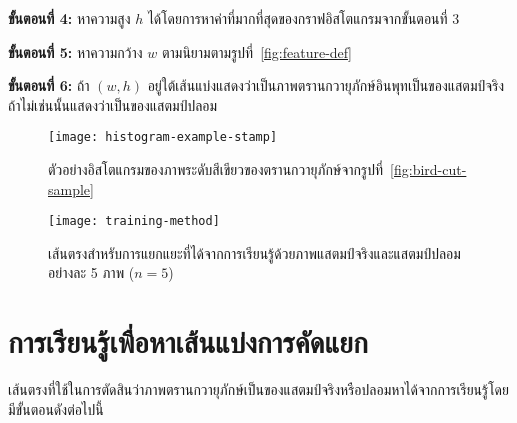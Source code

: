 \textbf{ขั้นตอนที่ 4:} หาความสูง $h$ ได้โดยการหาค่าที่มากที่สุดของกราฟอิสโตแกรมจากขั้นตอนที่ 3

\textbf{ขั้นตอนที่ 5:} หาความกว้าง $w$ ตามนิยามตามรูปที่~\ref{fig:feature-def}

\textbf{ขั้นตอนที่ 6:} ถ้า $(w,h)$ อยู่ใต้เส้นแบ่งแสดงว่าเป็นภาพตรานกวายุภักษ์อินพุทเป็นของแสตมป์จริง ถ้าไม่เช่นนั้นแสดงว่าเป็นของแสตมป์ปลอม



\begin{figure}[!ht]
\centering
\vspace{2em}
\texttt{[image: histogram-example-stamp]}
\vspace{2em}
\caption{ตัวอย่างอิสโตแกรมของภาพระดับสีเขียวของตรานกวายุภักษ์จากรูปที่~\ref{fig:bird-cut-sample}}
\label{fig:histogram-example}
\end{figure}

\begin{figure}[!hb]
\centering
\vspace{2em}
\texttt{[image: training-method]}
\vspace{2em}
\caption{เส้นตรงสำหรับการแยกแยะที่ได้จากการเรียนรู้ด้วยภาพแสตมป์จริงและแสตมป์ปลอมอย่างละ 5 ภาพ ($n=5$)}
\label{fig:training-result}
\end{figure}

\section{การเรียนรู้เพื่อหาเส้นแบ่งการคัดแยก}
\label{sec:training}
เส้นตรงที่ใช้ในการตัดสินว่าภาพตรานกวายุภักษ์เป็นของแสตมป์จริงหรือปลอมหาได้จากการเรียนรู้โดยมีขั้นตอนดังต่อไปนี้

